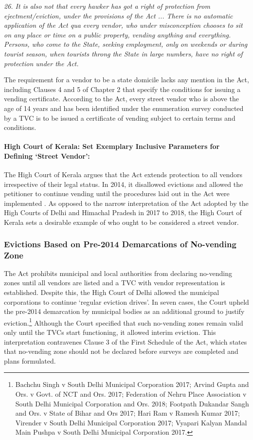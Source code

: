 \documentclass[a4paper, 12pt, twoside]{article}
\begin{document}
{\textit{26. It is also not that every hawker has got a right of protection from ejectment/eviction, under the provisions of the Act ... There is no automatic application of the Act qua every vendor, who under misconception chooses to sit on any place or time on a public property, vending anything and everything. Persons, who come to the State, seeking employment, only on weekends or during tourist season, when tourists throng the State in large numbers, have no right of protection under the Act.}

The requirement for a vendor to be a state domicile lacks any mention in the Act, including Clauses 4 and 5 of Chapter 2 that specify the conditions for issuing a vending certificate. According to the Act, every street vendor who is above the age of 14 years and has been identified under the enumeration survey conducted by a TVC is to be issued a certificate of vending subject to certain terms and conditions. 

\paragraph*{High Court of Kerala: Set Exemplary Inclusive Parameters for Defining `Street Vendor':}

The High Court of Kerala argues that the Act extends protection to all vendors irrespective of their legal status. In 2014, it disallowed evictions and allowed the petitioner to continue vending until the procedures laid out in the Act were implemented \parencite{Thankappan}. As opposed to the narrow interpretation of the Act adopted by the High Courts of Delhi and Himachal Pradesh in 2017 to 2018, the High Court of Kerala sets a desirable example of who ought to be considered a street vendor.

\subsubsection*{Evictions Based on Pre-2014 Demarcations of No-vending Zone}

The Act prohibits municipal and local authorities from declaring no-vending zones until all vendors are listed and a TVC with vendor representation is established. Despite this, the High Court of Delhi allowed the municipal corporations to continue `regular eviction drives'. In seven cases, the Court upheld the pre-2014 demarcation by municipal bodies as an additional ground to justify eviction.\footnote{Bachchu Singh v South Delhi Municipal Corporation 2017; Arvind Gupta and Ors. v Govt. of NCT and Ors. 2017; Federation of Nehru Place Association v South Delhi Municipal Corporation and Ors. 2018; Footpath Dukandar Sangh and Ors. v State of Bihar and Ors 2017; Hari Ram v Ramesh Kumar 2017; Virender v South Delhi Municipal Corporation 2017; Vyapari Kalyan Mandal Main Pushpa v South Delhi Municipal Corporation 2017.}  Although the Court specified that such no-vending zones remain valid only until the TVCs start functioning, it allowed interim eviction. This interpretation contravenes Clause 3 of the First Schedule of the Act, which states that no-vending zone should not be declared before surveys are completed and plans formulated.

}
\end{document}

